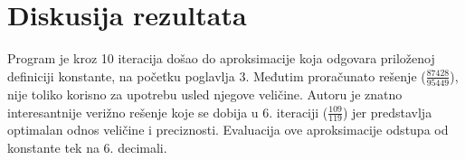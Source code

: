 \documentclass[a4paper,10pt]{article}
\begin{document}
\section{Diskusija rezultata}

Program je kroz 10 iteracija došao do aproksimacije koja odgovara priloženoj definiciji konstante, na početku poglavlja 3. Međutim proračunato rešenje ($\frac{87428}{95449}$), nije toliko korisno za upotrebu usled njegove veličine. Autoru je znatno interesantnije verižno rešenje koje se dobija u 6. iteraciji ($\frac{109}{119}$) jer predstavlja optimalan odnos veličine i preciznosti. Evaluacija ove aproksimacije odstupa od konstante tek na 6. decimali.






\end{document}

